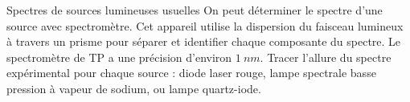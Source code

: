 \documentclass[12pt,fancy]{cours}
\begin{document}
\begin{experience}{Spectres de sources lumineuses usuelles}\label{exp:spectres}
  On peut déterminer le spectre d'une source avec spectromètre. Cet appareil utilise la dispersion du faisceau lumineux à travers un prisme pour séparer et identifier chaque composante du spectre. Le spectromètre de TP a une précision d'environ $\SI{1}{nm}$. Tracer l’allure du spectre expérimental pour chaque source : diode laser rouge, lampe spectrale basse pression à vapeur de sodium, ou lampe quartz-iode.
  

\end{experience}

\end{document}

